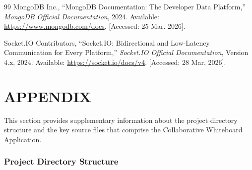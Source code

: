 \documentclass[12pt,a4paper]{report}
\begin{document}
\begin{thebibliography}{99}
MongoDB Inc., ``MongoDB Documentation: The Developer Data Platform,'' \textit{MongoDB Official Documentation}, 2024. Available: \url{https://www.mongodb.com/docs}. [Accessed: 25 Mar. 2026].

Socket.IO Contributors, ``Socket.IO: Bidirectional and Low-Latency Communication for Every Platform,'' \textit{Socket.IO Official Documentation}, Version 4.x, 2024. Available: \url{https://socket.io/docs/v4}. [Accessed: 28 Mar. 2026].

\end{thebibliography}


\newpage
\appendix
{}
\chapter*{APPENDIX}

This section provides supplementary information about the project directory structure and the key source files that comprise the Collaborative Whiteboard Application.

\subsection*{Project Directory Structure}
\end{document}
